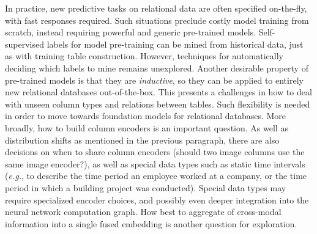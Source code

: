  In practice, new predictive tasks on relational data are often specified on-the-fly, with fast responses required. Such situations preclude costly model training from scratch, instead requiring powerful and generic pre-trained models. Self-supervised labels for model pre-training can be mined from historical data, just as with training table construction. However, techniques for automatically deciding which labels to mine remains unexplored. Another desirable property of pre-trained models is that they are \emph{inductive}, so they can be applied to entirely new relational databases out-of-the-box. This presents a challenges in how to deal with unseen column types and relations between tables. Such flexibility is needed in order to move towards foundation models for relational databases. More broadly, how to build column encoders is an important question. As well as distribution shifts as mentioned in the previous paragraph, there are also decisions on when to share column encoders (should two image columns use the same image encoder?), as well as special data types such as static time intervals (\emph{e.g.}, to describe the time period an employee worked at a company, or the time period in which a building project was conducted). Special data types may require specialized encoder choices, and possibly even deeper integration into the neural network computation graph. How best to aggregate of cross-modal information into a single fused embedding is another question for exploration. 

